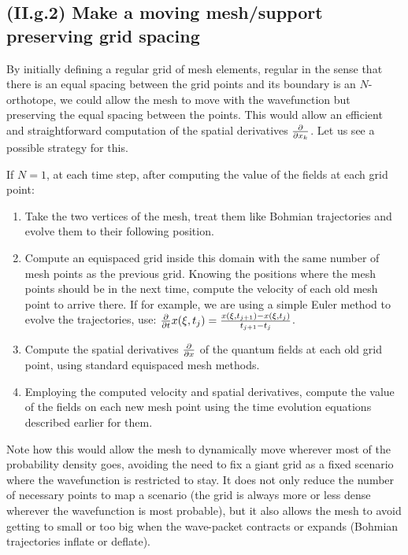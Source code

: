 \documentclass[11pt, a4paper]{article} %
\begin{document}
\subsection*{\bf (II.g.2) Make a moving mesh/support preserving grid spacing}\vspace{-0.2cm}
By initially defining a regular grid of mesh elements, regular in the sense that there is an equal spacing between the grid points and its boundary is an $N$-orthotope, we could allow the mesh to move with the wavefunction but preserving the equal spacing between the points. This would allow an efficient and straightforward computation of the spatial derivatives $\pdv{}{x_k}$. Let us see a possible strategy for this. 

If $N=1$, at each time step, after computing the value of the fields at each grid point:\vspace{-0.25cm}
\begin{enumerate}
\item Take the two vertices of the mesh, treat them like Bohmian trajectories and evolve them to their following position.\vspace{-0.05cm}
\item Compute an equispaced grid inside this domain with the same number of mesh points as the previous grid. Knowing the positions where the mesh points should be in the next time, compute the velocity of each old mesh point to arrive there. If for example, we are using a simple Euler method to evolve the trajectories, use: $\pdv{}{t}x(\xi,t_{j})=\frac{x(\xi,t_{j+1})-x(\xi,t_{j})}{t_{j+1}-t_j}$.
\item Compute the spatial derivatives $\pdv{}{x}$ of the quantum fields at each old grid point, using standard equispaced mesh methods.
\item Employing the computed velocity and spatial derivatives, compute the value of the fields on each new mesh point using the time evolution equations described earlier for them.\vspace{-0.2cm}
\end{enumerate}
Note how this would allow the mesh to dynamically move wherever most of the probability density goes, avoiding the need to fix a giant grid as a fixed scenario where the wavefunction is restricted to stay. It does not only reduce the number of necessary points to map a scenario (the grid is always more or less dense wherever the wavefunction is most probable), but it also allows the mesh to avoid getting to small or too big when the wave-packet contracts or expands (Bohmian trajectories inflate or deflate). 
 
\end{document}
